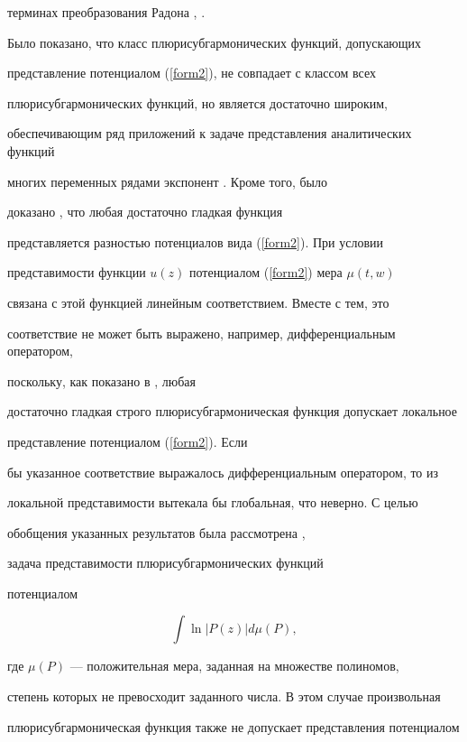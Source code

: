 терминах преобразования Радона \cite{Seker1}, \cite{Seker3}. 


Было показано, что класс плюрисубгармонических функций, допускающих 


представление потенциалом (\ref{form2}), не совпадает с классом всех 


плюрисубгармонических функций, но является достаточно широким, 


обеспечивающим ряд приложений к задаче представления аналитических функций 


многих переменных рядами экспонент \cite{Seker4}. Кроме того, было 


доказано \cite{Seker2}, что любая достаточно гладкая функция 


представляется разностью потенциалов вида (\ref{form2}). При условии 


представимости функции $u(z)$ потенциалом (\ref{form2}) мера $\mu(t, w)$ 


связана с этой функцией линейным соответствием. Вместе с тем, это 


соответствие не может быть выражено, например, дифференциальным оператором, 


поскольку, как показано в \cite{Seker6}, любая 


достаточно гладкая строго плюрисубгармоническая функция допускает локальное 


представление потенциалом (\ref{form2}). Если


бы указанное соответствие выражалось дифференциальным оператором, то из 


локальной представимости вытекала бы глобальная, что неверно. С целью 


обобщения указанных результатов была рассмотрена \cite{Seker5}, 


\cite{Seker7} задача представимости плюрисубгармонических функций 


потенциалом 


\begin{equation}\label{form3}


\int\ln|P(z)|d\mu(P),


\end{equation}


где $\mu(P)$ --- положительная мера, заданная на множестве полиномов, 


степень которых не превосходит заданного числа. В этом случае произвольная 


плюрисубгармоническая функция также не допускает представления потенциалом 


